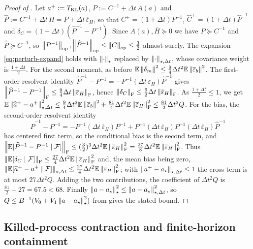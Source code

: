 \begin{proof}[Proof of ]
Let $a^+:=T_{\mathrm{KL}}(a)$, $P:=C^{-1}+\Delta t\,A(a)$ and
$\widehat P:=C^{-1}+\Delta t\,\overline H=P+\Delta t\,\overline\varepsilon_H$, so that
$C^+=(1+\Delta t)P^{-1}$, $\widehat C^+=(1+\Delta t)\widehat P^{-1}$ and
$\delta_C=(1+\Delta t)(\widehat P^{-1}-P^{-1})$. Since $A(a),\overline H\succeq0$ we have
$P\succeq C^{-1}$ and $\widehat P\succeq C^{-1}$, so
$\left\lVert P^{-1}\right\rVert_{\mathrm{op}},\left\lVert \widehat P^{-1}\right\rVert_{\mathrm{op}}\leq\left\lVert C\right\rVert_{\mathrm{op}}\leq\tfrac32$ almost surely. The expansion
\eqref{eq:perturb-expand} holds with $\left\lVert \cdot\right\rVert_\star$ replaced by $\left\lVert \cdot\right\rVert_{\star,\Delta t}$,
whose covariance weight is $\tfrac{1+\Delta t}2$.
For the second moment, as before $\mathbb{E}\left\lVert \delta_m\right\rVert^2\leq\tfrac94\Delta t^2\mathbb{E}\left\lVert \overline\varepsilon_b\right\rVert^2$.
The first-order resolvent identity
$\widehat P^{-1}-P^{-1}=-P^{-1}(\Delta t\,\overline\varepsilon_H)\widehat P^{-1}$ gives
$\left\lVert \widehat P^{-1}-P^{-1}\right\rVert_{\mathrm{F}}\leq\tfrac94\Delta t\left\lVert \overline\varepsilon_H\right\rVert_{\mathrm{F}}$, hence
$\left\lVert \delta_C\right\rVert_{\mathrm{F}}\leq\tfrac92\Delta t\left\lVert \overline\varepsilon_H\right\rVert_{\mathrm{F}}$. As
$\tfrac{1+\Delta t}2\leq1$, we get
$\mathbb{E}\left\lVert \widehat a^+-a^+\right\rVert_{\star,\Delta t}^2\leq\tfrac94\Delta t^2\mathbb{E}\left\lVert \overline\varepsilon_b\right\rVert^2+\tfrac{81}4\Delta t^2\mathbb{E}\left\lVert \overline\varepsilon_H\right\rVert_{\mathrm{F}}^2\leq\tfrac{81}2\Delta t^2Q$.
For the bias, the second-order resolvent identity
\[
    \widehat P^{-1}-P^{-1}=-P^{-1}(\Delta t\,\overline\varepsilon_H)P^{-1}+P^{-1}(\Delta t\,\overline\varepsilon_H)P^{-1}(\Delta t\,\overline\varepsilon_H)\widehat P^{-1}
\]
has centered first term, so the conditional bias is the second term, and
$\left\lVert \mathbb{E}[\widehat P^{-1}-P^{-1}\mid\mathcal{F}]\right\rVert_{\mathrm{F}}\leq(\tfrac32)^3\Delta t^2\mathbb{E}\left\lVert \overline\varepsilon_H\right\rVert_{\mathrm{F}}^2=\tfrac{27}8\Delta t^2\mathbb{E}\left\lVert \overline\varepsilon_H\right\rVert_{\mathrm{F}}^2$.
Thus $\left\lVert \mathbb{E}[\delta_C\mid\mathcal{F}]\right\rVert_{\mathrm{F}}\leq\tfrac{27}4\Delta t^2\mathbb{E}\left\lVert \overline\varepsilon_H\right\rVert_{\mathrm{F}}^2$
and, the mean bias being zero,
$\left\lVert \mathbb{E}[\widehat a^+-a^+\mid\mathcal{F}]\right\rVert_{\star,\Delta t}\leq\tfrac{27}4\Delta t^2\mathbb{E}\left\lVert \overline\varepsilon_H\right\rVert_{\mathrm{F}}^2$;
with $\left\lVert a^+-a_\star\right\rVert_{\star,\Delta t}\leq1$ the cross term is at most $27\Delta t^2Q$.
Adding the two contributions, the coefficient of $\Delta t^2Q$ is $\tfrac{81}2+27=67.5<68$. Finally
$\left\lVert a-a_\star\right\rVert_\star^2\leq\left\lVert a-a_\star\right\rVert_{\star,\Delta t}^2$, so
$Q\leq B^{-1}(V_0+V_1\left\lVert a-a_\star\right\rVert_\star^2)$ from  gives the stated bound.
\end{proof}

\subsection{Killed-process contraction and finite-horizon containment}

